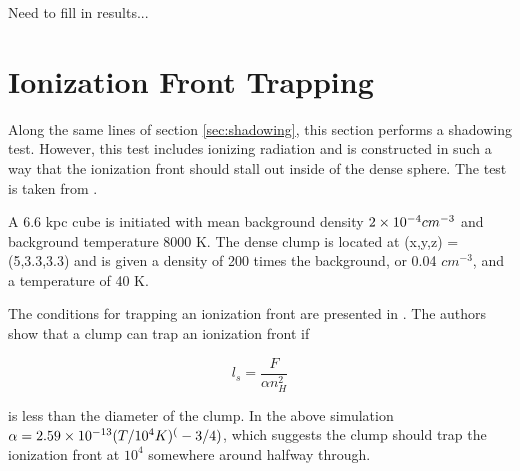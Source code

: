 Need to fill in results...


\section{Ionization Front Trapping}
\label{sec:ifronttrapping}

Along the same lines of section \ref{sec:shadowing}, this section performs a shadowing test. However, this test includes ionizing radiation and is constructed in such a way that the ionization front should stall out inside of the dense sphere. The test is taken from \citet{ilievEt06}.

A 6.6 kpc cube is initiated with mean background density $2\times 10^{-4} cm^{-3}$ and background temperature 8000 K. The dense clump is located at (x,y,z) = (5,3.3,3.3) and is given a density of 200 times the background, or 0.04 $cm^{-3}$, and a temperature of 40 K.

The conditions for trapping an ionization front are presented in \citet{shapiroEt04}. The authors show that a clump can trap an ionization front if

\begin{equation}
\label{eq:ifronttrap}
l_s = \frac{F}{\alpha n_H^2}
\end{equation}

is less than the diameter of the clump. In the above simulation $\alpha = 2.59\times 10^{-13} (T/10^4 K)^(-3/4)$, which suggests the clump should trap the ionization front at $10^4$ somewhere around halfway through.

